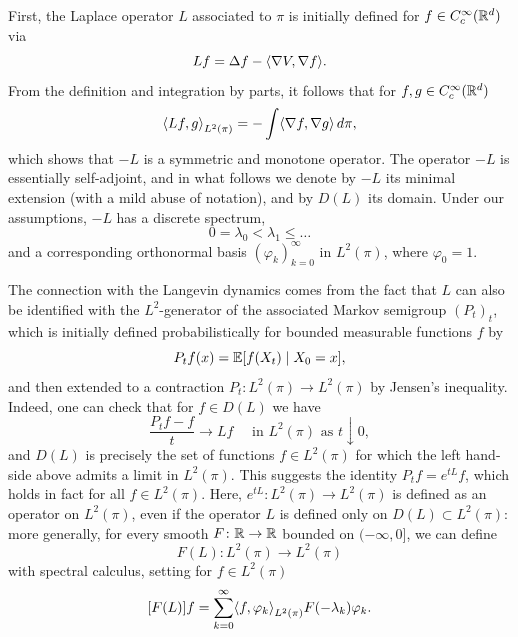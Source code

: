 \documentclass[11pt,a4paper]{article}
\begin{document}
    First, the Laplace operator $L$ associated to $\pi$
    is initially defined for $f \in C^\infty_c(\mathbb{R}^d)$ via
    \[
        Lf = \Delta f - \scal*{\nabla V, \nabla f}.
    \]
    From the definition and integration by parts, it follows that for $f,g \in C^\infty_c(\mathbb{R}^d) $
    \[
        \scal*{L f, g}_{L^2(\pi)} = - \int \scal*{\nabla f, \nabla g} \dd \pi,
    \]
    which shows that $-L$ is a symmetric and monotone operator. The operator $-L$
    is essentially self-adjoint, and in what follows we denote by $-L$ its minimal extension (with a mild abuse of notation), and by $D(L)$ its domain.
    Under our assumptions, $-L$ 
    has a discrete spectrum, 
    \[
        0 = \lambda_0 < \lambda_1 \le \ldots 
    \]
    and a corresponding orthonormal basis $(\varphi_k)_{k=0}^\infty$ in $L^2(\pi)$, where $\varphi_0 = 1$.
    
    The connection with the Langevin dynamics comes from the fact that $L$ can also be identified with the $L^2$-generator of the associated Markov semigroup $(P_t)_t$, which  is initially defined probabilistically for bounded measurable functions $f$ by
    \[
        P_t f(x) = \expe{f(X_t) \mid X_0 = x},
    \]
    and then extended to a contraction $P_t \colon L^2(\pi)\to L^2(\pi)$ by Jensen's inequality.
    Indeed, one can check that for $f \in D(L)$ we have 
    \[
        \frac{P_t f-f}{t} \to Lf \quad \text{ in } L^2(\pi) \text{ as } t\downarrow 0,
    \]
    and $D(L)$ is precisely the set of functions $f\in L^2(\pi)$ for which the left hand-side above admits a limit in $L^2(\pi)$.
    This suggests the identity $P_t f = e^{tL} f$, which holds in fact for all $f \in L^2(\pi)$.
    Here, $e^{tL} \colon L^2(\pi) \to L^2(\pi)$ is defined as an operator on $L^2(\pi)$, even if the operator $L$ is defined only on $D(L) \subset L^2(\pi)$: more generally, for every smooth $F\colon \mathbb{R}\to \mathbb{R}$ bounded on $(-\infty, 0]$, we can define
    \[
        F(L) \colon L^2(\pi) \to L^2(\pi)
    \]
    with spectral calculus, setting for $f\in L^2(\pi)$
    \[
        [F(L)]f  = \sum_{k =0}^\infty \scal*{f, \varphi_k}_{L^2(\pi)} F(-\lambda_k) \varphi_k.
    \]
    
    
\end{document}
